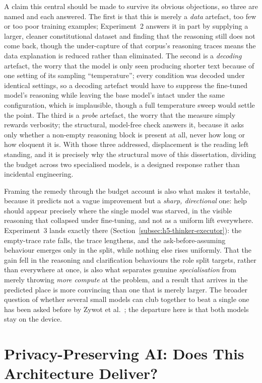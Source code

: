 A claim this central should be made to survive its obvious objections, so three are named and each answered. The first is that this is merely a \emph{data} artefact, too few or too poor training examples; Experiment~2 answers it in part by supplying a larger, cleaner constitutional dataset and finding that the reasoning still does not come back, though the under-capture of that corpus's reasoning traces means the data explanation is reduced rather than eliminated. The second is a \emph{decoding} artefact, the worry that the model is only seen producing shorter text because of one setting of its sampling ``temperature''; every condition was decoded under identical settings, so a decoding artefact would have to suppress the fine-tuned model's reasoning while leaving the base model's intact under the same configuration, which is implausible, though a full temperature sweep would settle the point. The third is a \emph{probe} artefact, the worry that the measure simply rewards verbosity; the structural, model-free check answers it, because it asks only whether a non-empty reasoning block is present at all, never how long or how eloquent it is. With those three addressed, displacement is the reading left standing, and it is precisely why the structural move of this dissertation, dividing the budget across two specialised models, is a designed response rather than incidental engineering.

Framing the remedy through the budget account is also what makes it testable, because it predicts not a vague improvement but a \emph{sharp, directional} one: help should appear precisely where the single model was starved, in the visible reasoning that collapsed under fine-tuning, and not as a uniform lift everywhere. Experiment~3 lands exactly there (Section~\ref{subsec:h5-thinker-executor}): the empty-trace rate falls, the trace lengthens, and the ask-before-assuming behaviour emerges only in the split, while nothing else rises uniformly. That the gain fell in the reasoning and clarification behaviours the role split targets, rather than everywhere at once, is also what separates genuine \emph{specialisation} from merely throwing \emph{more compute} at the problem, and a result that arrives in the predicted place is more convincing than one that is merely larger. The broader question of whether several small models can club together to beat a single one has been asked before by Zywot et al.\ \cite{zywot2026smallagentscollaboratebeat}; the departure here is that both models stay on the device.

\section{Privacy-Preserving AI: Does This Architecture Deliver?}
\label{sec:privacy-preserving-ai}


